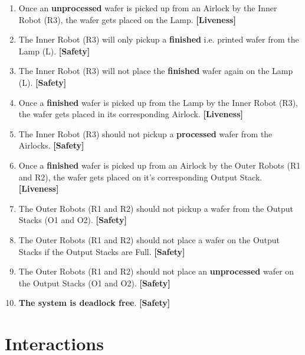 \documentclass[a4paper,12pt]{article}
\begin{document}
\begin{enumerate}
\begin{enumerate}
		\end{enumerate}
		\item Once an \textbf{unprocessed} wafer is picked up from an Airlock by the Inner Robot (R3), the wafer gets placed on the Lamp. \textbf{[Liveness]}
		\item The Inner Robot (R3) will only pickup a \textbf{finished} i.e. printed wafer from the Lamp (L). \textbf{[Safety]}
		\item The Inner Robot (R3) will not place the \textbf{finished} wafer again on the Lamp (L). \textbf{[Safety]}
		\item Once a \textbf{finished} wafer is picked up from the Lamp by the Inner Robot (R3), the wafer gets placed in its corresponding Airlock. \textbf{[Liveness]}
		\item The Inner Robot (R3) should not pickup a \textbf{processed} wafer from the Airlocks. \textbf{[Safety]}
		\item Once a \textbf{finished} wafer is picked up from an Airlock by the Outer Robots (R1 and R2), the wafer gets placed on it's corresponding Output Stack. \textbf{[Liveness]}
		\item The Outer Robots (R1 and R2) should not pickup a wafer from the Output Stacks (O1 and O2). \textbf{[Safety]}
		\item The Outer Robots (R1 and R2) should not place a wafer on the Output Stacks if the Output Stacks are Full. \textbf{[Safety]}
		\item The Outer Robots (R1 and R2) should not place an \textbf{unprocessed} wafer on the Output Stacks (O1 and O2). \textbf{[Safety]}
		\item \textbf{The system is deadlock free}. \textbf{[Safety]}
		
	\end{enumerate}
	
	\newpage
	\section{Interactions}
\end{document}
